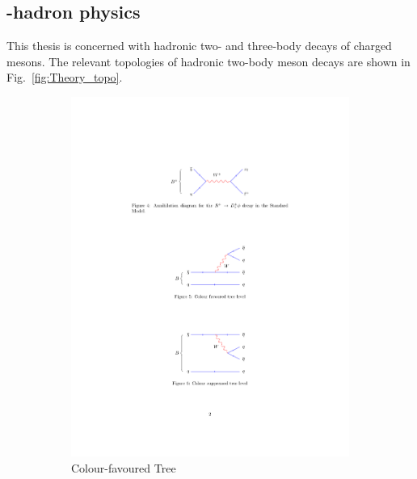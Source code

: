 \subsection{\bquark-hadron physics}

This thesis is concerned with hadronic two- and three-body decays of charged \B mesons.
The relevant topologies of hadronic two-body \B meson decays are shown in Fig.~\ref{fig:Theory_topo}. 
\begin{figure}[!h]
    \centering
    \begin{subfigure}[b]{0.32\textwidth}
        \centering
        \includegraphics[width=1.0\textwidth]{figs/Theory/TreeFav.pdf}
        \caption{Colour-favoured Tree}
        \label{fig:theory_colour_fav}
    \end{subfigure}
    \begin{subfigure}[b]{0.32\textwidth}
        \centering

\end{subfigure}
\end{figure}
